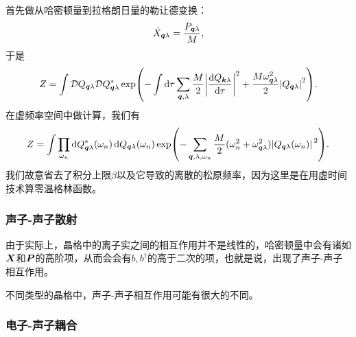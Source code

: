 \documentclass[hyperref, UTF8, a4paper]{ctexart}
\begin{document}
首先做从哈密顿量到拉格朗日量的勒让德变换：
\[
    \dot{X}_{\vb*{q} \lambda} = \frac{P_{\vb*{q} \lambda}}{M},
\]
于是
\begin{equation}
    Z = \int \mathcal{D} Q_{\vb*{q} \lambda} \mathcal{D} Q^*_{\vb*{q} \lambda} \exp(- \int \dd{\tau} \sum_{\vb*{q}, \lambda} \frac{M}{2} \abs{\dv{Q_{\vb*{k} \lambda}}{\tau}}^2 + \frac{M \omega_{\vb*{q} \lambda}^2}{2} \abs{Q_{\vb*{q} \lambda}}^2 ).
\end{equation}
在虚频率空间中做计算，我们有
\begin{equation}
    Z = \int \prod_{\omega_n} \dd{Q_{\vb*{q} \lambda}^*(\omega_n)} \dd{Q_{\vb*{q} \lambda}(\omega_n)} \exp(- \sum_{\vb*{q}, \lambda, \omega_n} \frac{M}{2} (\omega_n^2 + \omega_{\vb*{q} \lambda}^2) \abs*{Q_{\vb*{q} \lambda}(\omega_n)}^2).
\end{equation}
我们故意省去了积分上限$\beta$以及它导致的离散的松原频率，因为这里是在用虚时间技术算零温格林函数。

\subsubsection{声子-声子散射}

由于实际上，晶格中的离子实之间的相互作用并不是线性的，哈密顿量中会有诸如$\vb*{X}$和$\vb*{P}$的高阶项，从而会会有${b}, {b}^\dagger$的高于二次的项，也就是说，出现了声子-声子相互作用。

不同类型的晶格中，声子-声子相互作用可能有很大的不同。

\subsubsection{电子-声子耦合}
\end{document}
